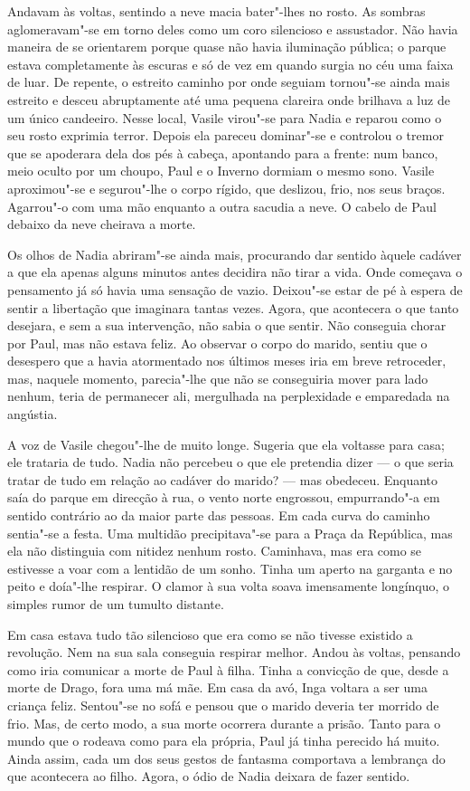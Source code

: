 Andavam às voltas, sentindo a neve macia bater"-lhes no rosto. As sombras
aglomeravam"-se em torno deles como um coro silencioso e assustador. Não
havia maneira de se orientarem porque quase não havia iluminação
pública; o parque estava completamente às escuras e só de vez em quando
surgia no céu uma faixa de luar. De repente, o estreito caminho por onde seguiam tornou"-se ainda mais estreito e desceu
abruptamente até uma pequena clareira onde brilhava a luz de um único
candeeiro. Nesse local, Vasile virou"-se para Nadia e reparou como o seu
rosto exprimia terror. Depois ela pareceu dominar"-se e controlou o
tremor que se apoderara dela dos pés à cabeça, apontando para a
frente: num banco, meio oculto por um choupo, Paul e o Inverno dormiam o
mesmo sono. Vasile aproximou"-se e segurou"-lhe o corpo rígido, que
deslizou, frio, nos seus braços. Agarrou"-o com uma mão enquanto a outra
sacudia a neve. O cabelo de Paul debaixo da neve cheirava a morte.

Os olhos de Nadia abriram"-se ainda mais, procurando dar sentido àquele
cadáver a que ela apenas alguns minutos antes decidira não tirar a
vida. Onde começava o pensamento já só havia uma sensação de vazio.
Deixou"-se estar de pé à espera de sentir a libertação que imaginara
tantas vezes. Agora, que acontecera o que tanto desejara, e sem a sua
intervenção, não sabia o que sentir. Não conseguia chorar por Paul,
mas não estava feliz. Ao observar o corpo do marido, sentiu que o
desespero que a havia atormentado nos últimos meses iria em breve
retroceder, mas, naquele momento, parecia"-lhe que não se conseguiria
mover para lado nenhum, teria de permanecer ali, mergulhada na
perplexidade e emparedada na angústia.

A voz de Vasile chegou"-lhe de muito longe. Sugeria que
ela voltasse para casa; ele trataria de tudo. Nadia não percebeu o que
ele pretendia dizer --- o que seria tratar de tudo em relação ao cadáver
do marido? --- mas obedeceu. Enquanto saía do parque em direcção à rua, o
vento norte
engrossou, empurrando"-a em sentido contrário ao da maior parte das
pessoas. Em cada curva do caminho sentia"-se a festa. Uma multidão
precipitava"-se para a Praça da República, mas ela não distinguia com
nitidez nenhum rosto. Caminhava, mas era como se estivesse a voar com a
lentidão de um sonho. Tinha um aperto na garganta e no peito e
doía"-lhe respirar. O clamor à sua volta soava imensamente longínquo, o
simples rumor de um tumulto distante.

Em casa estava tudo tão silencioso que era como se não tivesse existido
a revolução. Nem na sua sala conseguia respirar melhor. Andou às voltas,
pensando como iria comunicar a morte de Paul à filha. Tinha a convicção
de que, desde a morte de Drago, fora uma má mãe. Em casa da avó, Inga
voltara a ser uma criança feliz. Sentou"-se no sofá e pensou que o marido
deveria ter morrido de frio. Mas, de certo modo, a sua morte ocorrera
durante a prisão. Tanto para o mundo que o rodeava como para ela
própria, Paul já tinha perecido há muito. Ainda assim, cada um dos seus
gestos de fantasma comportava a lembrança do que acontecera ao filho.
Agora, o ódio de Nadia deixara de fazer sentido.

